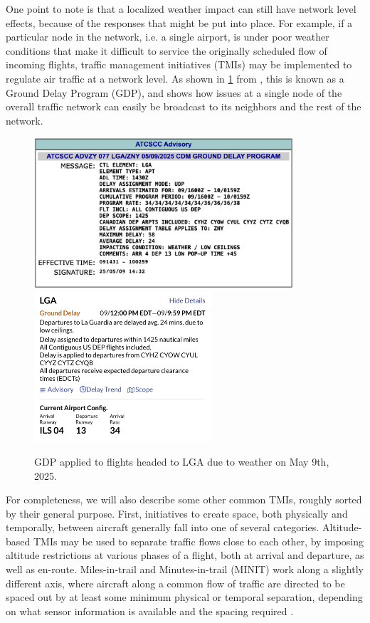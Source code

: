 One point to note is that a localized weather impact can still have network level effects, because of the responses that might be put into place. For example, if a particular node in the network, i.e. a single airport, is under poor weather conditions that make it difficult to service the originally scheduled flow of incoming flights, traffic management initiatives (TMIs) may be implemented to regulate air traffic at a network level. As shown in \cref{fig:gdp-example} from \cite{faa_status_2025}, this is known as a Ground Delay Program (GDP), and shows how issues at a single node of the overall traffic network can easily be broadcast to its neighbors and the rest of the network.

\begin{figure}[htb!]
    \centering
    \includegraphics[height=2.2in]{media/gdp_advisory.png}
    \includegraphics[height=2.2in]{media/gdp_meaning.png}
    \caption{GDP applied to flights headed to LGA due to weather on May 9th, 2025.}
    \label{fig:gdp-example}
\end{figure}

For completeness, we will also describe some other common TMIs, roughly sorted by their general purpose. First, initiatives to create space, both physically and temporally, between aircraft generally fall into one of several categories. Altitude-based TMIs may be used to separate traffic flows close to each other, by imposing altitude restrictions at various phases of a flight, both at arrival and departure, as well as en-route. Miles-in-trail and Minutes-in-trail (MINIT) work along a slightly different axis, where aircraft along a common flow of traffic are directed to be spaced out by at least some minimum physical or temporal separation, depending on what sensor information is available and the spacing required \cite{faa_tfm_prez_2009}.

